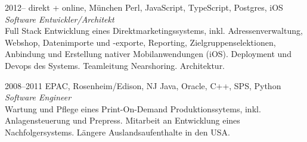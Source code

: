 \documentclass[]{friggeri-cv-a4}
\begin{document}

\begin{entrylist}
\entry
{2012--}
{direkt + online, München}
{Perl, JavaScript, TypeScript, Postgres, iOS}
{\emph{Software Entwickler/Architekt} \\
Full Stack Entwicklung eines Direktmarketingssystems, inkl. Adressenverwaltung, Webshop, Datenimporte und -exporte, Reporting, Zielgruppenselektionen, Anbindung und Erstellung nativer Mobilanwendungen (iOS). Deployment und Devops des Systems. Teamleitung Nearshoring. Architektur.}
\end{entrylist}


\begin{entrylist}
\entry
{2008--2011}
{EPAC, Rosenheim/Edison, NJ}
{Java, Oracle, C++, SPS, Python}
{\emph{Software Engineer} \\
Wartung und Pflege eines Print-On-Demand Produktionssytems, inkl. Anlagensteuerung und Prepress. Mitarbeit an Entwicklung eines Nachfolgersystems. Längere Auslandsaufenthalte in den USA.}
\end{entrylist}
\end{document}
